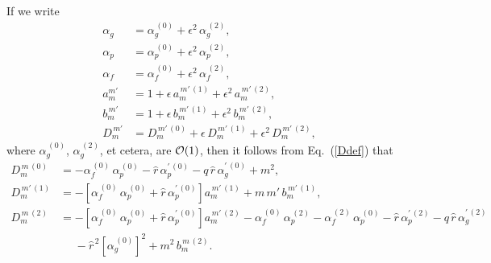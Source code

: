 \documentclass[12pt,prb,aps,notitlepage]{revtex4-1}
\begin{document}
If we write
\begin{align}
\alpha_g&= \alpha_g^{\,(0)} + \epsilon^2\,\alpha_g^{\,(2)},\\[0.5ex]
\alpha_p&= \alpha_p^{\,(0)} + \epsilon^2\,\alpha_p^{\,(2)},\\[0.5ex]
\alpha_f&= \alpha_f^{\,(0)} + \epsilon^2\,\alpha_f^{\,(2)},\\[0.5ex]
a_{m}^{m'} &= 1 + \epsilon\,a_m^{\,m'\,(1)} + \epsilon^2\,a_{m}^{\,m'\,(2)},\\[0.5ex]
b_{m}^{\,m'} &= 1 + \epsilon\,b_m^{\,m'\,(1)} + \epsilon^2\,b_{m}^{\,m'\,(2)},\\[0.5ex]
D_{m}^{\,m'} &= D_m^{\,m'\,(0)} + \epsilon\,D_m^{\,m'\,(1)} + \epsilon^2\,D_{m}^{\,m'\,(2)},
\end{align}
where $\alpha_g^{\,(0)}$, $\alpha_g^{\,(2)}$, et cetera, are ${\cal O}(1)$, 
then it follows from Eq.~(\ref{Ddef}) that
\begin{align}\label{e130}
D_m^{\,m\,(0)} &= -\alpha_f^{\,(0)}\,\alpha_p^{\,(0)} - \hat{r}\,\alpha_p^{\prime\,(0)} - q\,\hat{r}\,\alpha_g^{\prime\,(0)} + m^2,\\[0.5ex]
D_{m}^{\,m'\,(1)}&=   - \left[\alpha_f^{\,(0)}\,\alpha_p^{\,(0)} + \hat{r}\,\alpha_p^{\prime\,(0)}\right]a_m^{\,m'\,(1)} + m\,m'\,b_m^{\,m'\,(1)},\\[0.5ex]
D_{m}^{\,m\,(2)}&=  -\left[\alpha_f^{\,(0)}\,\alpha_p^{\,(0)} + \hat{r}\,\alpha_p^{\prime\,(0)}\right]a_m^{\,m'\,(2)} 
-\alpha_f^{\,(0)}\,\alpha_p^{\,(2)}-\alpha_f^{\,(2)}\,\alpha_p^{\,(0)}-\hat{r}\,\alpha_p^{\prime\,(2)} - q\,\hat{r}\,\alpha_g^{\prime\,(2)}\nonumber\\[0.5ex]&\phantom{=}
-\hat{r}^{\,2}\left[\alpha_g^{\,(0)}\right]^2+m^2\,b_m^{\,m\,(2)}.\label{e132}
\end{align}
\end{document}
